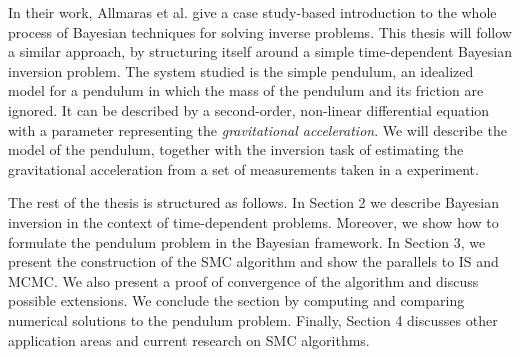 In their work, Allmaras et al. \cite{bayes-tutorial} give a case study-based introduction to the whole process of Bayesian techniques for solving inverse problems. This thesis will follow a similar approach, by structuring itself around a simple time-dependent Bayesian inversion problem. The system studied is the simple pendulum, an idealized model for a pendulum in which the mass of the pendulum and its friction are ignored. It can be described by a second-order, non-linear differential equation with a parameter representing the \textit{gravitational acceleration}. We will describe the model of the pendulum, together with the inversion task of estimating the gravitational acceleration from a set of measurements taken in a experiment. 


The rest of the thesis is structured as follows. In Section 2 we describe Bayesian inversion in the context of time-dependent problems. Moreover, we show how to formulate the pendulum problem in the Bayesian framework. In Section 3, we present the construction of the SMC algorithm and show the parallels to IS and MCMC. We also present a proof of convergence of the algorithm and discuss possible extensions. We conclude the section by computing and comparing numerical solutions to the pendulum problem. Finally, Section 4 discusses other application areas and current research on SMC algorithms.

